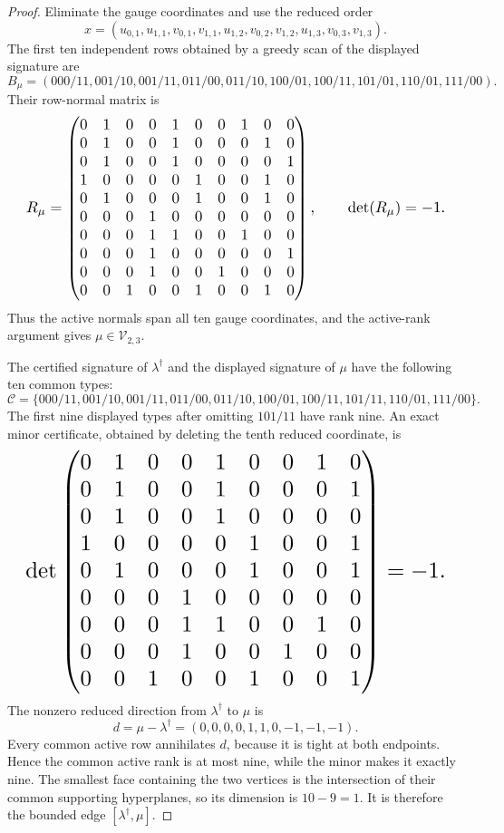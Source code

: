\documentclass{article}
\begin{document}
\begin{proof}
Eliminate the gauge coordinates and use the reduced order
\[x=(u_{0,1},u_{1,1},v_{0,1},v_{1,1},u_{1,2},v_{0,2},v_{1,2},u_{1,3},v_{0,3},v_{1,3}).\]
The first ten independent rows obtained by a greedy scan of the displayed signature are
\[B_\mu=(000/11,001/10,001/11,011/00,011/10,100/01,100/11,101/01,110/01,111/00).\]
Their row-normal matrix is
\[
\makebox[\linewidth][c]{\resizebox{0.98\linewidth}{!}{\par\noindent \makebox[\linewidth][c]{\resizebox{0.98\linewidth}{!}{\(\displaystyle \displaystyle R_\mu=\begin{pmatrix}0&1&0&0&1&0&0&1&0&0\\0&1&0&0&1&0&0&0&1&0\\0&1&0&0&1&0&0&0&0&1\\1&0&0&0&0&1&0&0&1&0\\0&1&0&0&0&1&0&0&1&0\\0&0&0&1&0&0&0&0&0&0\\0&0&0&1&1&0&0&1&0&0\\0&0&0&1&0&0&0&0&0&1\\0&0&0&1&0&0&1&0&0&0\\0&0&1&0&0&1&0&0&1&0\end{pmatrix},\qquad\det(R_\mu)=-1.\)}}\par\noindent}}
\]
Thus the active normals span all ten gauge coordinates, and the active-rank argument gives \(\mu\in\mathcal V_{2,3}\).

The certified signature of \(\lambda^\dagger\) and the displayed signature of \(\mu\) have the following ten common types:
\[\mathcal C=\{000/11,001/10,001/11,011/00,011/10,100/01,100/11,101/11,110/01,111/00\}.\]
The first nine displayed types after omitting \(101/11\) have rank nine. An exact minor certificate, obtained by deleting the tenth reduced coordinate, is
\[
\makebox[\linewidth][c]{\resizebox{0.98\linewidth}{!}{\par\noindent \makebox[\linewidth][c]{\resizebox{0.98\linewidth}{!}{\(\displaystyle \displaystyle \det\begin{pmatrix}0&1&0&0&1&0&0&1&0\\0&1&0&0&1&0&0&0&1\\0&1&0&0&1&0&0&0&0\\1&0&0&0&0&1&0&0&1\\0&1&0&0&0&1&0&0&1\\0&0&0&1&0&0&0&0&0\\0&0&0&1&1&0&0&1&0\\0&0&0&1&0&0&1&0&0\\0&0&1&0&0&1&0&0&1\end{pmatrix}=-1.\)}}\par\noindent}}
\]
The nonzero reduced direction from \(\lambda^\dagger\) to \(\mu\) is
\[d=\mu-\lambda^\dagger=(0,0,0,0,1,1,0,-1,-1,-1).\]
Every common active row annihilates \(d\), because it is tight at both endpoints. Hence the common active rank is at most nine, while the minor makes it exactly nine. The smallest face containing the two vertices is the intersection of their common supporting hyperplanes, so its dimension is \(10-9=1\). It is therefore the bounded edge \([\lambda^\dagger,\mu]\).


\end{proof}
\end{document}
